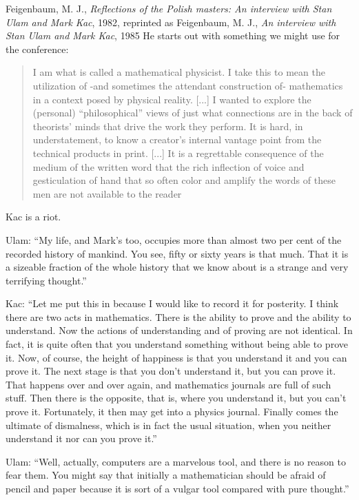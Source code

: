 \begin{description}
{Feigenbaum, M. J.},
{\em Reflections of the {Polish} masters: {An} interview with {Stan Ulam} and {Mark Kac}},
{1982},
reprinted as
{Feigenbaum, M. J.},
  {\em An interview with {Stan Ulam} and {Mark Kac}},
  {1985}
He starts out with something we might use for the conference:

\begin{quote}
I am what is called a mathematical physicist. I take this to mean the
utilization of -and sometimes the attendant construction of- mathematics
in a context posed by physical reality.
[...]
I wanted to explore the (personal) ``philosophical'' views of just what
connections are in the back of theorists' minds that drive the work they
perform. It is hard, in understatement, to know a creator's internal
vantage point from the technical products in print.
[...]
It is a regrettable consequence of the medium of the
written word that the rich inflection of voice and gesticulation of
hand that so often color and amplify the words of these men are not
available to the reader
\end{quote}

Kac is a riot.

Ulam: ``My life, and Mark's too, occupies more than almost two per cent
of the recorded history of mankind. You see, fifty or sixty years is that
much. That it is a sizeable fraction of the whole history that we know
about is a strange and very terrifying thought.''

Kac: ``Let me put this in because I would like to
record it for posterity. I think there are two acts in mathematics.
There is the ability to prove and the ability to understand. Now the
actions of understanding and of proving are not identical. In fact, it is
quite often that you understand something without being able to
prove it. Now, of course, the height of happiness is that you
understand it and you can prove it. The next stage is that you don't
understand it, but you can prove it. That happens over and over
again, and mathematics journals are full of such stuff. Then there is
the opposite, that is, where you understand it, but you can't prove it.
Fortunately, it then may get into a physics journal. Finally comes the
ultimate of dismalness, which is in fact the usual situation, when you
neither understand it nor can you prove it.''

Ulam: ``Well, actually, computers are a marvelous tool, and there is
no reason to fear them. You might say that initially a mathematician
should be afraid of pencil and paper because it is sort of a vulgar tool
compared with pure thought.''


\end{description}
